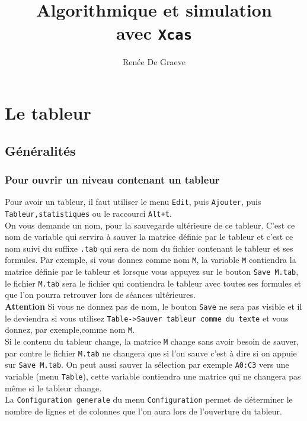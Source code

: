 \documentclass[a4paper,11pt]{book}
\title{Algorithmique et simulation \\ avec {\tt Xcas}}
\author{Ren\'ee De Graeve}
\begin{document}
\maketitle
\chapter{Le tableur}
\section{G\'en\'eralit\'es}
\subsection{Pour ouvrir un niveau contenant un tableur}
Pour avoir un tableur, il faut utiliser le menu {\tt Edit}, puis {\tt Ajouter},
puis {\tt Tableur,statistiques} ou le raccourci {\tt Alt+t}. \\
On vous demande un nom, pour la sauvegarde ult\'erieure de ce tableur. 
C'est ce nom de variable qui servira \`a sauver la matrice d\'efinie par le 
tableur et c'est ce nom suivi du suffixe {\tt .tab} qui sera de nom du fichier
 contenant le tableur et ses formules. Par exemple, si vous donnez comme nom 
{\tt M},  la variable {\tt M} 
contiendra la matrice d\'efinie par le tableur 
et lorsque vous appuyez sur le bouton {\tt Save M.tab}, le fichier {\tt M.tab} 
sera le fichier qui contiendra le tableur avec toutes ses 
formules et que l'on pourra retrouver lors de s\'eances ult\'erieures.\\
{\bf Attention} 
Si vous ne donnez pas de nom, le bouton {\tt Save} ne sera pas visible et il le
deviendra si vous utilisez {\tt Table->Sauver tableur comme du texte} et vous 
donnez, par exemple,comme nom {\tt M}.\\
Si le contenu du tableur change, la matrice {\tt M} change sans
avoir besoin de sauver, par contre le fichier {\tt M.tab} ne changera que si 
l'on sauve c'est \`a dire si on appuie sur {\tt Save M.tab}.
On peut aussi sauver la s\'election par exemple {\tt A0:C3} vers une variable 
(menu {\tt Table}), cette variable contiendra une matrice qui ne changera pas 
m\^eme si le tableur change.\\
La {\tt Configuration generale} du menu {\tt Configuration} permet de 
d\'eterminer  le nombre de lignes et de colonnes que l'on aura lors de 
l'ouverture du tableur. 
\end{document}
